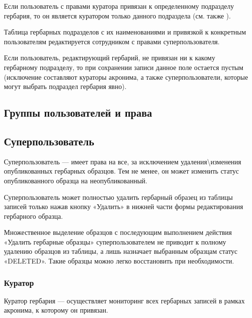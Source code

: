\documentclass[letterpaper,10pt,russian]{sphinxmanual}
\begin{document}
Если пользователь с правами куратора привязан к определенному подразделу
гербария, то он является куратором только
данного подраздела (см. также {\hyperref[\detokenize{main:id8}]{}}).

Таблица гербарных подразделов с их наименованиями и привязкой к
конкретным пользователям редактируется сотрудником с правами суперпользователя.

Если пользователь, редактирующий гербарий, не привязан ни
к какому гербарному подразделу, то при сохранении записи данное поле
остается пустым (исключение составляют кураторы акронима, а также суперпользователи,
которые могут выбрать подраздел гербария явно).

\ignorespaces 

\subsection{Группы пользователей и права}
\label{\detokenize{main:id8}}\label{\detokenize{main:index-4}}

\subsection{Суперпользователь}
\label{\detokenize{main:id9}}
Суперпользователь — имеет права на все,
за исключением удаления\textbackslash{}изменения опубликованных гербарных образцов.
Тем не менее, он может изменить статус опубликованного образца на неопубликованный.

Суперпользователь может полностью удалить гербарный образец из таблицы записей только
нажав кнопку «Удалить» в нижней части формы редактирования гербарного образца.

Множественное выделение образцов с последующим выполнением действия «Удалить гербарные образцы»
суперпользователем не приводит к полному удалению образцов из таблицы, а лишь
назначает выбранным образцам статус «DELETED». Такие образцы можно легко
восстановить при необходимости.

\ignorespaces 

\subsubsection{Куратор}
\label{\detokenize{main:id10}}\label{\detokenize{main:index-5}}
Куратор гербария — осуществляет мониторинг всех гербарных записей в рамках акронима,
к которому он привязан.
\end{document}
